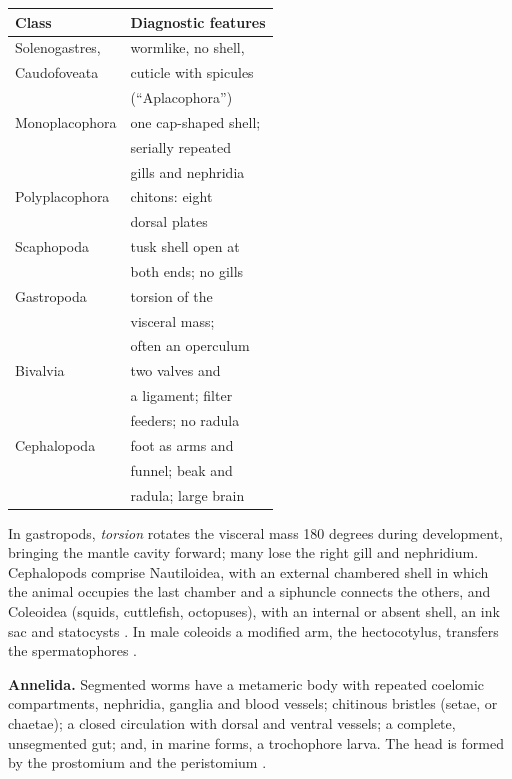 \begin{center}
\begin{tabular}{ll}
Class & Diagnostic features \\
\hline
Solenogastres, & wormlike, no shell, \\
Caudofoveata & cuticle with spicules \\
& (``Aplacophora'') \\
Monoplacophora & one cap-shaped shell; \\
& serially repeated \\
& gills and nephridia \\
Polyplacophora & chitons: eight \\
& dorsal plates \\
Scaphopoda & tusk shell open at \\
& both ends; no gills \\
Gastropoda & torsion of the \\
& visceral mass; \\
& often an operculum \\
Bivalvia & two valves and \\
& a ligament; filter \\
& feeders; no radula \\
Cephalopoda & foot as arms and \\
& funnel; beak and \\
& radula; large brain \\
\end{tabular}
\end{center}

In gastropods, \emph{torsion} rotates the
visceral mass 180 degrees during development,
bringing the mantle cavity forward; many lose
the right gill and nephridium. Cephalopods
comprise Nautiloidea, with an external
chambered shell in which the animal occupies
the last chamber and a siphuncle connects the
others, and Coleoidea (squids, cuttlefish,
octopuses), with an internal or absent shell,
an ink sac and statocysts \cite[Chapter
10]{hickman2002animal}. In male coleoids a
modified arm, the hectocotylus, transfers the
spermatophores \cite[Chapter
20]{brusca2003invertebrates}.

\textbf{Annelida.} Segmented worms have a
metameric body with repeated coelomic
compartments, nephridia, ganglia and blood
vessels; chitinous bristles (setae, or
chaetae); a closed circulation with dorsal
and ventral vessels; a complete, unsegmented
gut; and, in marine forms, a trochophore
larva. The head is formed by the prostomium
and the peristomium \cite[Chapter
11]{hickman2002animal}.

